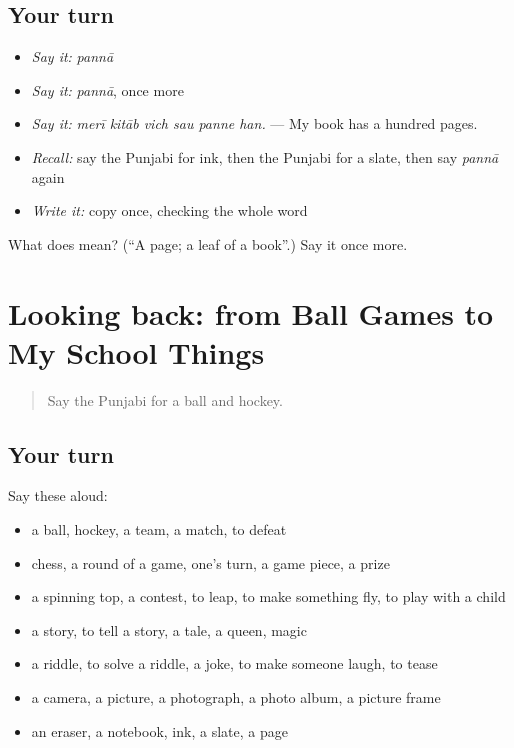 \subsection*{Your turn}
\begin{itemize}
\raggedright
  \item \emph{Say it:} \emph{pannā}
  \item \emph{Say it:} \emph{pannā}, once more
  \item \emph{Say it:} \emph{merī kitāb vich sau panne han.} — My book has a hundred pages.
  \item \emph{Recall:} say the Punjabi for ink, then the Punjabi for a slate, then say \emph{pannā} again
  \item \emph{Write it:} copy \textbf{} once, checking the whole word
\end{itemize}

\begin{tcolorbox}[breakable,colback=teal!4,colframe=teal!35!black,title={Before you move on}]
What does  mean? (\textquotedblleft{}A page; a leaf of a book\textquotedblright{}.) Say it once more.
\end{tcolorbox}
\section[(dialogue)]{Looking back: from Ball Games to My School Things}

\label{lesson:PA-R357-review-351-357}



\begin{quote}
Say the Punjabi for a ball and hockey.
\end{quote}

\subsection*{Your turn}
Say these aloud:

\begin{itemize}
\raggedright
  \item a ball, hockey, a team, a match, to defeat
  \item chess, a round of a game, one's turn, a game piece, a prize
  \item a spinning top, a contest, to leap, to make something fly, to play with a child
  \item a story, to tell a story, a tale, a queen, magic
  \item a riddle, to solve a riddle, a joke, to make someone laugh, to tease
  \item a camera, a picture, a photograph, a photo album, a picture frame
  \item an eraser, a notebook, ink, a slate, a page
\end{itemize}

